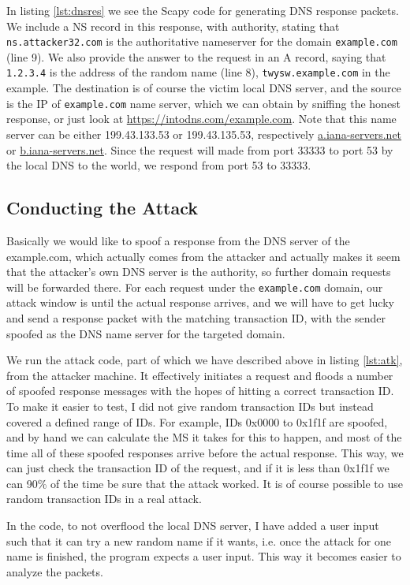 \documentclass[12pt,reqno]{amsart}
\newcommand{\code}[1]{\texttt{#1}}
\begin{document}
In listing \ref{lst:dnsres} we see the Scapy code for generating DNS response packets. We include a NS record in this response, with authority, stating that \code{ns.attacker32.com} is the authoritative nameserver for the domain \code{example.com} (line 9). We also provide the answer to the request in an A record, saying that \code{1.2.3.4} is the address of the random name (line 8), \code{twysw.example.com} in the example. The destination is of course the victim local DNS server, and the source is the IP of \code{example.com} name server, which we can obtain by sniffing the honest response, or just look at \url{https://intodns.com/example.com}. Note that this name server can be either 199.43.133.53 or 199.43.135.53, respectively \url{a.iana-servers.net} or \url{b.iana-servers.net}. Since the request will made from port 33333 to port 53 by the local DNS to the world, we respond from port 53 to 33333.


\subsection*{Conducting the Attack}
Basically we would like to spoof a response from the DNS server of the example.com, which actually comes from the attacker and actually makes it seem that the attacker's own DNS server is the authority, so further domain requests will be forwarded there. For each request under the \code{example.com} domain, our attack window is until the actual response arrives, and we will have to get lucky and send a response packet with the matching transaction ID, with the sender spoofed as the DNS name server for the targeted domain.

We run the attack code, part of which we have described above in listing \ref{lst:atk}, from the attacker machine. It effectively initiates a request and floods a number of spoofed response messages with the hopes of hitting a correct transaction ID. To make it easier to test, I did not give random transaction IDs but instead covered a defined range of IDs. For example, IDs 0x0000 to 0x1f1f are spoofed, and by hand we can calculate the MS it takes for this to happen, and most of the time all of these spoofed responses arrive before the actual response. This way, we can just check the transaction ID of the request, and if it is less than 0x1f1f we can 90\% of the time be sure that the attack worked. It is of course possible to use random transaction IDs in a real attack.

In the code, to not overflood the local DNS server, I have added a user input such that it can try a new random name if it wants, i.e. once the attack for one name is finished, the program expects a user input. This way it becomes easier to analyze the packets.
\end{document}
